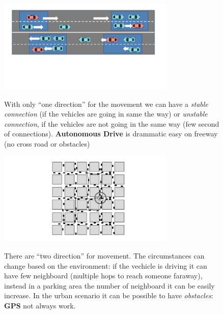 \begin{figure}[h]
    \centering
    \begin{minipage}[t]{0.45\textwidth}
        \centering
        \includegraphics[width=0.75\textwidth]{img/v2x_freeway}

        \begin{flushleft}
            With only ``one direction'' for the movement we can have a \textit{stable connection} (if the vehicles are going in same the way) or \textit{unstable connection}, if the vehicles are not going in the same way (few second of connections).
            \textbf{Autonomous Drive} is drammatic easy on freeway (no cross road or obstacles)
        \end{flushleft}
    \end{minipage}
    \begin{minipage}[t]{0.45\textwidth}
        \centering
        \includegraphics[width=0.75\textwidth]{img/v2x_urban}

        \begin{flushleft}
            There are ``two direction'' for movement. The circumstances can change based on the environment: if the vechicle is driving it can have few neighboard (multiple hops to reach someone faraway), instead in a parking area the number of neighboard it can be easily increase. In the urban scenario it can be possible to have \textit{obstacles}: \textbf{GPS} not always work.
        \end{flushleft}
    \end{minipage}
\end{figure}
